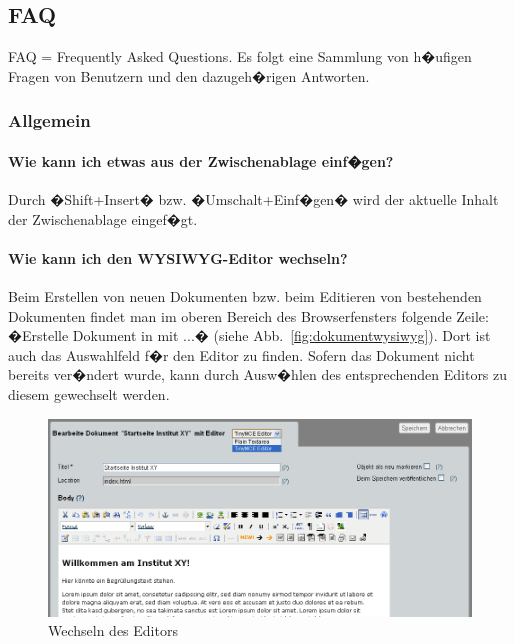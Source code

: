 \subsection{FAQ}
\label{faq}

FAQ = Frequently Asked Questions. Es folgt eine Sammlung von h�ufigen Fragen
von Benutzern und den dazugeh�rigen Antworten.

\subsubsection{Allgemein}
\label{faq-allg}

\paragraph{Wie kann ich etwas aus der Zwischenablage einf�gen?}

Durch �Shift+Insert� bzw. �Umschalt+Einf�gen� wird der aktuelle Inhalt der
Zwischenablage eingef�gt.

\paragraph{Wie kann ich den WYSIWYG-Editor wechseln?}

Beim Erstellen von neuen Dokumenten bzw. beim Editieren von bestehenden
Dokumenten findet man im oberen Bereich des Browserfensters folgende Zeile: �Erstelle Dokument  in  mit ...� (siehe
Abb.~\ref{fig:dokumentwysiwyg}). Dort ist auch das Auswahlfeld f�r den Editor zu finden.
Sofern das Dokument nicht bereits ver�ndert wurde, kann durch Ausw�hlen des
entsprechenden Editors zu diesem gewechselt werden.

\begin{figure}[!ht]
	\centering
		\includegraphics[width=\textwidth]{./images/wysiwyg-change.png}
	\caption{Wechseln des Editors}
	\label{fig:wysiwygchange}
\end{figure}

